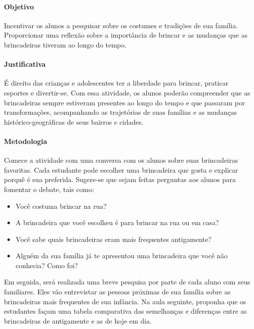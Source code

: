 \documentclass[11pt]{extarticle}
\begin{document}
\paragraph{Objetivo} Incentivar os alunos a pesquisar sobre os costumes e tradições de sua família. Proporcionar uma reflexão sobre a importância de brincar e as mudanças que as brincadeiras tiveram ao longo do tempo.

\paragraph{Justificativa} É direito das crianças e adolescentes ter a liberdade para brincar, praticar esportes e divertir-se. Com essa atividade, os alunos poderão compreender que as brincadeiras sempre estiveram presentes ao longo do tempo e que passaram por transformações, acompanhando as trajetórias de suas famílias e as mudanças histórico-geográficas de seus bairros e cidades. 

\paragraph{Metodologia} Comece a atividade com uma conversa com os alunos sobre suas brincadeiras favoritas. Cada estudante pode escolher uma brincadeira que gosta e explicar porquê é sua preferida. Sugere-se que sejam feitas perguntas aos alunos para fomentar o debate, tais como:

\begin{itemize}

\item Você costuma brincar na rua?

\item A brincadeira que você escolheu é para brincar na rua ou em casa?

\item Você sabe quais brincadeiras eram mais frequentes antigamente?

\item Alguém da sua família já te apresentou uma brincadeira que você não conhecia? Como foi?

\end{itemize}


Em seguida, será realizada uma breve pesquisa por parte de cada aluno com seus familiares. Eles vão entrevistar as pessoas próximas de sua família sobre as brincadeiras mais frequentes de sua infância. Na aula seguinte, proponha que os estudantes façam uma tabela comparativa das semelhanças e diferenças entre as brincadeiras de antigamente e as de hoje em dia.
\end{document}
